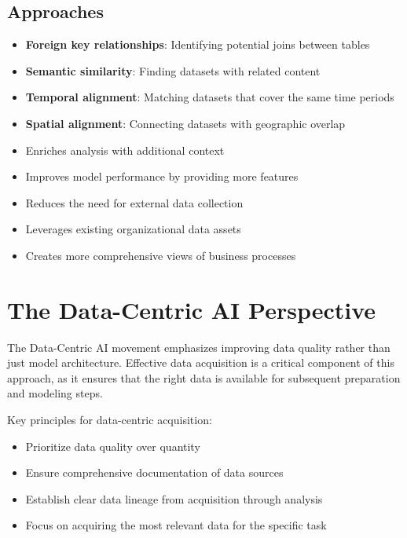 \documentclass[12pt]{article}
\begin{document}
\subsection{Approaches}
\begin{itemize}
    \item \textbf{Foreign key relationships}: Identifying potential joins between tables
    \item \textbf{Semantic similarity}: Finding datasets with related content
    \item \textbf{Temporal alignment}: Matching datasets that cover the same time periods
    \item \textbf{Spatial alignment}: Connecting datasets with geographic overlap
\end{itemize}

\begin{tcolorbox}[colback=green!5!white,colframe=green!75!black,title=Benefits of Data Augmentation]
\begin{itemize}
    \item Enriches analysis with additional context
    \item Improves model performance by providing more features
    \item Reduces the need for external data collection
    \item Leverages existing organizational data assets
    \item Creates more comprehensive views of business processes
\end{itemize}
\end{tcolorbox}

\section{The Data-Centric AI Perspective}

\begin{tcolorbox}[colback=yellow!5!white,colframe=yellow!75!black,title=Data-Centric Approach]
The Data-Centric AI movement emphasizes improving data quality rather than just model architecture. Effective data acquisition is a critical component of this approach, as it ensures that the right data is available for subsequent preparation and modeling steps.

Key principles for data-centric acquisition:
\begin{itemize}
    \item Prioritize data quality over quantity
    \item Ensure comprehensive documentation of data sources
    \item Establish clear data lineage from acquisition through analysis
    \item Focus on acquiring the most relevant data for the specific task
\end{itemize}
\end{tcolorbox}
\end{document}
